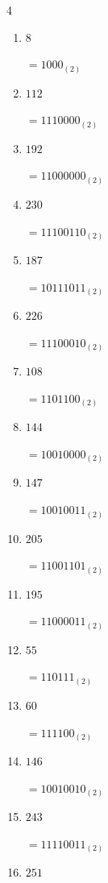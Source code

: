 \begin{multicols}{4}
\begin{enumerate}
        $=11000110_{(2)}$

  \item $8$

        $=1000_{(2)}$

  \item $112$

        $=1110000_{(2)}$

  \item $192$

        $=11000000_{(2)}$

  \item $230$

        $=11100110_{(2)}$

  \item $187$

        $=10111011_{(2)}$

  \item $226$

        $=11100010_{(2)}$

  \item $108$

        $=1101100_{(2)}$

  \item $144$

        $=10010000_{(2)}$

  \item $147$

        $=10010011_{(2)}$

\columnbreak %

\resetques

  \item $205$

        $=11001101_{(2)}$

  \item $195$

        $=11000011_{(2)}$

  \item $55$

        $=110111_{(2)}$

  \item $60$

        $=111100_{(2)}$

  \item $146$

        $=10010010_{(2)}$

  \item $243$

        $=11110011_{(2)}$

  \item $251$


\end{enumerate}
\end{multicols}
